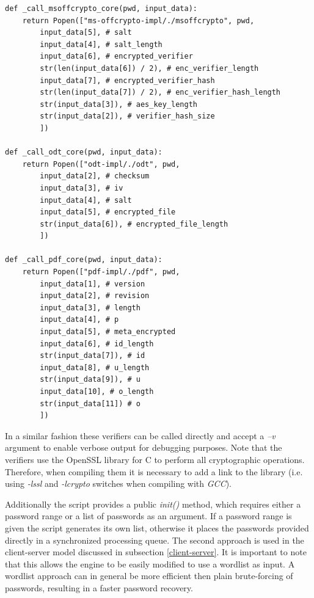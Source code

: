 \documentclass[11pt,oneside]{fithesis2}
\begin{document}
\begin{lstlisting}
def _call_msoffcrypto_core(pwd, input_data):
    return Popen(["ms-offcrypto-impl/./msoffcrypto", pwd, 
        input_data[5], # salt
        input_data[4], # salt_length
        input_data[6], # encrypted_verifier
        str(len(input_data[6]) / 2), # enc_verifier_length
        input_data[7], # encrypted_verifier_hash
        str(len(input_data[7]) / 2), # enc_verifier_hash_length
        str(input_data[3]), # aes_key_length
        str(input_data[2]), # verifier_hash_size
        ])

def _call_odt_core(pwd, input_data):
    return Popen(["odt-impl/./odt", pwd, 
        input_data[2], # checksum
        input_data[3], # iv
        input_data[4], # salt
        input_data[5], # encrypted_file
        str(input_data[6]), # encrypted_file_length
        ]) 

def _call_pdf_core(pwd, input_data):
    return Popen(["pdf-impl/./pdf", pwd, 
        input_data[1], # version
        input_data[2], # revision
        input_data[3], # length
        input_data[4], # p
        input_data[5], # meta_encrypted 
        input_data[6], # id_length 
        str(input_data[7]), # id
        input_data[8], # u_length 
        str(input_data[9]), # u 
        input_data[10], # o_length
        str(input_data[11]) # o
        ]) 
\end{lstlisting}


In a similar fashion these verifiers can be called directly and accept a \textit{–v} argument to enable verbose output for debugging purposes. Note that the verifiers use the OpenSSL library for C \cite{openssl} to perform all cryptographic operations. Therefore, when compiling them it is necessary to add a link to the library (i.e. using \textit{-lssl} and \textit{-lcrypto} switches when compiling with \textit{GCC}).

Additionally the script provides a public \textit{init()} method, which requires either a password range or a list of passwords as an argument. If a password range is given the script generates its own list, otherwise it places the passwords provided directly in a synchronized processing queue. The second approach is used in the client-server model discussed in subsection \ref{client-server}. It is important to note that this allows the engine to be easily modified to use a wordlist as input. A wordlist approach can in general be more efficient then plain brute-forcing of passwords, resulting in a faster password recovery.
\end{document}
